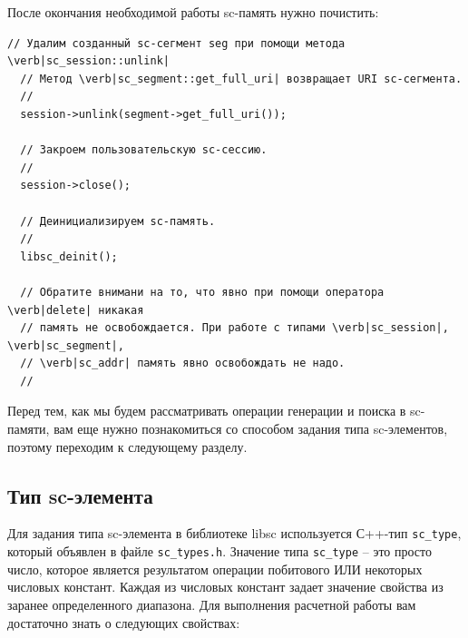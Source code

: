 После окончания необходимой работы sc-память нужно почистить:
\begin{lstlisting}[texcl]
  // Удалим созданный sc-сегмент seg при помощи метода \verb|sc_session::unlink|
  // Метод \verb|sc_segment::get_full_uri| возвращает URI sc-сегмента.
  //
  session->unlink(segment->get_full_uri());

  // Закроем пользовательскую sc-сессию.
  //
  session->close();

  // Деинициализируем sc-память.
  //
  libsc_deinit();

  // Обратите внимани на то, что явно при помощи оператора \verb|delete| никакая 
  // память не освобождается. При работе с типами \verb|sc_session|, \verb|sc_segment|,
  // \verb|sc_addr| память явно освобождать не надо.
  //
\end{lstlisting}

Перед тем, как мы будем рассматривать операции генерации и поиска в
sc-памяти, вам еще нужно познакомиться со способом задания типа
sc-элементов, поэтому переходим к следующему разделу.

\subsection{Тип sc-элемента}

Для задания типа sc-элемента в библиотеке libsc используется С++-тип
\lstinline{sc_type}, который объявлен в файле
\verb|sc_types.h|. Значение типа \lstinline{sc_type} – это просто
число, которое является результатом операции побитового ИЛИ некоторых
числовых констант. Каждая из числовых констант задает значение
свойства из заранее определенного диапазона. Для выполнения расчетной
работы вам достаточно знать о следующих свойствах:

